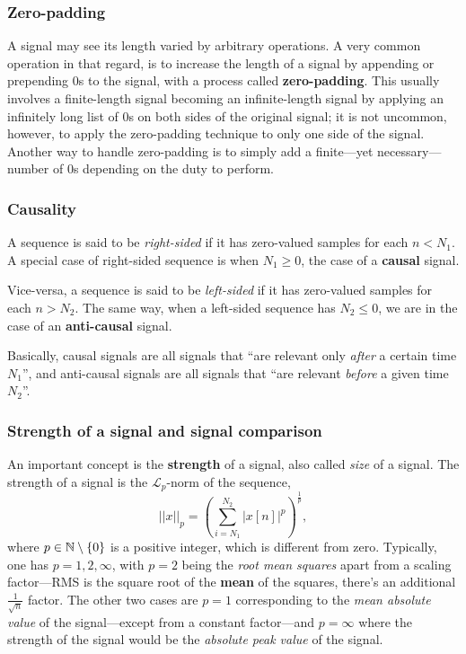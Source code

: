\documentclass[\documentfontsize, twocolumn]{\classname}
\begin{document}
\subsubsection{Zero-padding}

A signal may see its length varied by arbitrary operations. A very common operation in that regard, is to increase the length of a signal by appending or prepending $0$s to the signal, with a process called \textbf{zero-padding}. This usually involves a finite-length signal becoming an infinite-length signal by applying an infinitely long list of $0$s on both sides of the original signal; it is not uncommon, however, to apply the zero-padding technique to only one side of the signal. Another way to handle zero-padding is to simply add a finite---yet necessary---number of $0$s depending on the duty to perform.

\subsubsection{Causality}

A se\-quen\-ce is said to be \emph{right-sided} if it has zero-valued samples for each $n < N_1$. A special case of right-sided se\-quen\-ce is when $N_1 \geq 0$, the case of a \textbf{causal} signal.

Vice-versa, a se\-quen\-ce is said to be \emph{left-sided} if it has zero-valued samples for each $n > N_2$. The same way, when a left-sided se\-quen\-ce has $N_2 \leq 0$, we are in the case of an \textbf{anti-causal} signal.

Basically, causal signals are all signals that ``are relevant only \emph{after} a certain time $N_1$'', and anti-causal signals are all signals that ``are relevant \emph{before} a given time $N_2$''.

\subsubsection{Strength of a signal and signal comparison}

An important concept is the \textbf{strength} of a signal, also called \emph{size} of a signal. The strength of a signal is the $\mathcal{L}_p$-norm of the se\-quen\-ce,
\[
||x||_p = \left(\sum_{i=N_1}^{N_2} |x[n]|^p\right)^{\frac{1}{p}},
\]
where $p \in \mathbb N \setminus \{0\}$ is a positive integer, which is different from zero. Typically, one has $p=1,2,\infty$, with $p=2$ being the \emph{root mean squares} apart from a scaling factor---RMS is the square root of the \textbf{mean} of the squares, there's an additional $\frac{1}{\sqrt{n}}$ factor. The other two cases are $p=1$ corresponding to the \emph{mean absolute value} of the signal---except from a constant factor---and $p=\infty$ where the strength of the signal would be the \emph{absolute peak value} of the signal.
\end{document}
